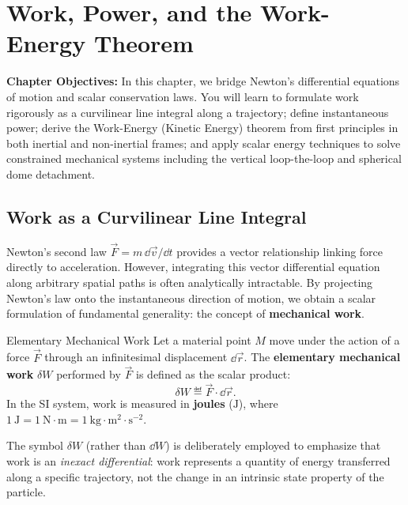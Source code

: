 \chapter{Work, Power, and the Work-Energy Theorem}
\label{ch:work_energy}

\begin{chapterintro}
\textbf{Chapter Objectives:} In this chapter, we bridge Newton's differential equations of motion and scalar conservation laws. You will learn to formulate work rigorously as a curvilinear line integral along a trajectory; define instantaneous power; derive the Work-Energy (Kinetic Energy) theorem from first principles in both inertial and non-inertial frames; and apply scalar energy techniques to solve constrained mechanical systems including the vertical loop-the-loop and spherical dome detachment.
\end{chapterintro}

\section{Work as a Curvilinear Line Integral}

Newton's second law $\vec{F} = m\,\dd\vec{v}/\dd t$ provides a vector relationship linking force directly to acceleration. However, integrating this vector differential equation along arbitrary spatial paths is often analytically intractable. By projecting Newton's law onto the instantaneous direction of motion, we obtain a scalar formulation of fundamental generality: the concept of \textbf{mechanical work}.

\begin{definitionbox}{Elementary Mechanical Work}
Let a material point $M$ move under the action of a force $\vec{F}$ through an infinitesimal displacement $\dd\vec{r}$. The \textbf{elementary mechanical work} $\delta W$ performed by $\vec{F}$ is defined as the scalar product:
\begin{equation}
\delta W \eqdef \vec{F} \cdot \dd\vec{r}.
\end{equation}
In the SI system, work is measured in \textbf{joules} ($\mathrm{J}$), where $1\ \mathrm{J} = 1\ \mathrm{N\cdot m} = 1\ \mathrm{kg\cdot m^2\cdot s^{-2}}$.
\end{definitionbox}

The symbol $\delta W$ (rather than $\dd W$) is deliberately employed to emphasize that work is an \emph{inexact differential}: work represents a quantity of energy transferred along a specific trajectory, not the change in an intrinsic state property of the particle.


